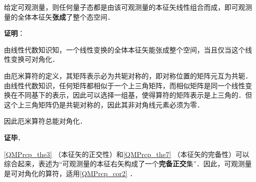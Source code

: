 \begin{theorem}{}\label{QMPrcp_the7}
给定可观测量，则任何量子态都是由该可观测量的本征矢线性组合而成，即可观测量的全体本征矢\textbf{张成}了整个态空间．
\end{theorem}

\textbf{证明}：

由线性代数知识知，一个线性变换的全体本征矢能张成整个空间，当且仅当这个线性变换可对角化．

由厄米算符的定义，其矩阵表示必为共轭对称的，即对称位置的矩阵元互为共轭．由线性代数知识，任何矩阵都相似于一个上三角矩阵，而相似矩阵是同一个线性变换在不同基下的表示，因此可以选择一组基，使得算符的矩阵表示是上三角的．但这个上三角矩阵仍是共轭对称的，因此其非对角线元素必须为零．

因此厄米算符总能对角化．

\textbf{证毕}．


\autoref{QMPrcp_the3} （本征矢的正交性）和\autoref{QMPrcp_the7} （本征矢的完备性）可以综合起来，表述为“可观测量的本征右矢构成了一个\textbf{完备正交}集”．因此，可观测量是可对角化的算符，适用\autoref{QMPrcp_cor2} ．










